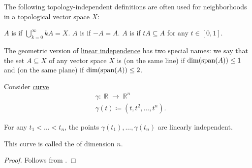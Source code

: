 \begin{definition}\label{def:neighborhood_set_types}
  The following topology-independent definitions are often used for neighborhoods in a topological vector space \( X \):

  \begin{thmenum}
     \( A \) is  if \( \bigcup_{k=0}^\infty kA = X \).
     \( A \) is  if \( -A = A \).
     \( A \) is  if \( tA \subseteq A \) for any \( t \in [0, 1] \).
  \end{thmenum}
\end{definition}

\begin{definition}\label{def:collinear_complanar}
  The geometric version of \hyperref[def:linear_dependence]{linear independence} has two special names: we say that the set \( A \subseteq X \) of any vector space \( X \) is  (on the same line) if \( \dim(\operatorname{span}(A)) \leq 1 \) and  (on the same plane) if \( \dim(\operatorname{span}(A)) \leq 2 \).
\end{definition}

\begin{proposition}\label{thm:moment_curve}
  Consider \hyperref[def:parametric_curve]{curve}
  \begin{equation*}
    \begin{aligned}
      &\gamma: \BbbR \to \BbbR^n \\
      &\gamma(t) \coloneqq (t, t^2, \ldots, t^n).
    \end{aligned}
  \end{equation*}

  For any \( t_1 < \ldots < t_n \), the points \( \gamma(t_1), \ldots, \gamma(t_n) \) are linearly independent.

  This curve is called the  of dimension \( n \).
\end{proposition}
\begin{proof}
  Follows from .
\end{proof}
